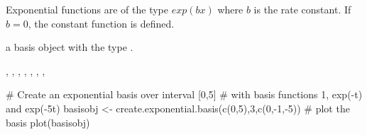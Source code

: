 \begin{Details}\relax
Exponential functions are of the type $exp(bx)$ where $b$
is the rate constant.  If $b = 0$, the constant function is
defined.
\end{Details}
\begin{Value}
a basis object with the type .
\end{Value}
\begin{SeeAlso}\relax
{}, 
, 
, 
, 
, 
, 
, 
\end{SeeAlso}
\begin{Examples}
\begin{ExampleCode}

#  Create an exponential basis over interval [0,5]
#  with basis functions 1, exp(-t) and exp(-5t)
basisobj <- create.exponential.basis(c(0,5),3,c(0,-1,-5))
#  plot the basis
plot(basisobj)

\end{ExampleCode}
\end{Examples}

